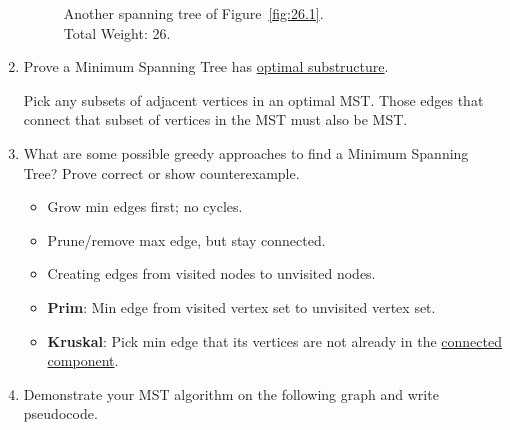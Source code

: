 \documentclass[26]{cs430lecture}
\begin{document}
\begin{enumerate}
\begin{newanswer}
\begin{minipage}{0.5\textwidth}
\begin{figure}[H]
			\caption{Another spanning tree of Figure~\ref{fig:26.1}.\\
			Total Weight: 26.}
			\label{fig:26.1-spanning-tree-2}
		\end{figure}
		\end{minipage}
	\end{newanswer}
	\item Prove a Minimum Spanning Tree has \hyperref[dfn:optimal-substructure]{optimal substructure}.
	\begin{newanswer}
		Pick any subsets of adjacent vertices in an optimal MST.
		Those edges that connect that subset of vertices in the MST must also be MST.
	\end{newanswer}
	\item What are some possible greedy approaches to find a Minimum Spanning Tree?
	Prove correct or show counterexample.
	\begin{newanswer}
		\begin{itemize}
				\item Grow min edges first; no cycles.
				\item Prune/remove max edge, but stay connected.
				\item Creating edges from visited nodes to unvisited nodes.
				\item \textbf{Prim}\label{dfn:prim}: Min edge from visited vertex set to unvisited vertex set.
				\item \textbf{Kruskal}\label{dfn:kruskal}:
				Pick min edge that its vertices are not already in the \hyperref[sec:strongly-connected-components]{connected component}.
		\end{itemize}
	\end{newanswer}
	\item Demonstrate your MST algorithm on the following graph and write pseudocode.
	\begin{figure}[H]
		\centering
\end{figure}
\end{enumerate}
\end{document}
